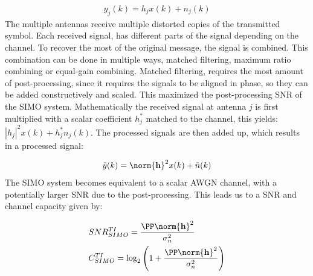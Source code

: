 \begin{align*}
  y_j(k) = h_j x(k) + n_j(k)
\end{align*}
The multiple antennas receive multiple distorted copies of the transmitted symbol. Each received signal, has different parts of the signal depending on the channel. To recover the most of the original message, the signal is combined. This combination can be done in multiple ways, matched filtering, maximum ratio combining or equal-gain combining. Matched filtering, requires the most amount of post-processing, since it requires the signals to be aligned in phase, so they can be added constructively and scaled. This maximized the post-processing SNR of the SIMO system. Mathematically the received signal at antenna $j$ is first multiplied with a scalar coefficient $h_j^*$ matched to the channel, this yields: $|h_j|^2 x(k) + h_j^* n_j(k)$. The processed signals are then added up, which results in a processed signal\cite{Tim2012Practical}: 

\begin{align*}
  \tilde{y}(k) = \norm{\mathbf{h}}^2 x(k) + \tilde{n}(k)
\end{align*}
The SIMO system becomes equivalent to a scalar AWGN channel, with a potentially larger SNR due to the post-processing\cite{Tim2012Practical}. This leads us to a SNR and channel capacity given by: 

\begin{align*}
&SNR^{TI}_{SIMO} = \frac{\PP \norm{\mathbf{h}}^2}{\sigma^2_n} \\
&C^{TI}_{SIMO} = \log_2 \left( 1+\frac{\PP \norm{\mathbf{h}}^2}{\sigma^2_n} \right)  
\end{align*}

